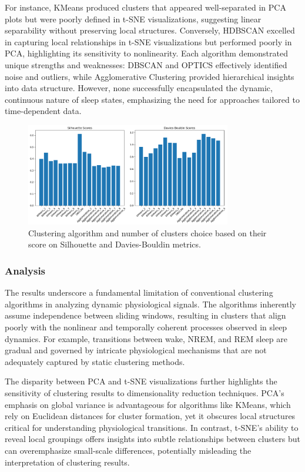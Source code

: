 \documentclass[a4paper,12pt,twoside]{article}
\begin{document}
For instance, KMeans produced clusters that appeared well-separated in PCA plots but were poorly defined in t-SNE visualizations, suggesting linear separability without preserving local structures. Conversely, HDBSCAN excelled in capturing local relationships in t-SNE visualizations but performed poorly in PCA, highlighting its sensitivity to nonlinearity. Each algorithm demonstrated unique strengths and weaknesses: DBSCAN and OPTICS effectively identified noise and outliers, while Agglomerative Clustering provided hierarchical insights into data structure. However, none successfully encapsulated the dynamic, continuous nature of sleep states, emphasizing the need for approaches tailored to time-dependent data.

\begin{figure}[H]
    \centering
    \includegraphics[width=0.8\textwidth]{img/sliding window clusters and algo choice.png}
    \caption{Clustering algorithm and number of clusters choice based on their score on Silhouette and Davies-Bouldin metrics.}
    \label{fig:clustering_algo_choice}
\end{figure}


\subsubsection{Analysis}

The results underscore a fundamental limitation of conventional clustering algorithms in analyzing dynamic physiological signals. The algorithms inherently assume independence between sliding windows, resulting in clusters that align poorly with the nonlinear and temporally coherent processes observed in sleep dynamics. For example, transitions between wake, NREM, and REM sleep are gradual and governed by intricate physiological mechanisms that are not adequately captured by static clustering methods.

The disparity between PCA and t-SNE visualizations further highlights the sensitivity of clustering results to dimensionality reduction techniques. PCA’s emphasis on global variance is advantageous for algorithms like KMeans, which rely on Euclidean distances for cluster formation, yet it obscures local structures critical for understanding physiological transitions. In contrast, t-SNE's ability to reveal local groupings offers insights into subtle relationships between clusters but can overemphasize small-scale differences, potentially misleading the interpretation of clustering results.
\end{document}
